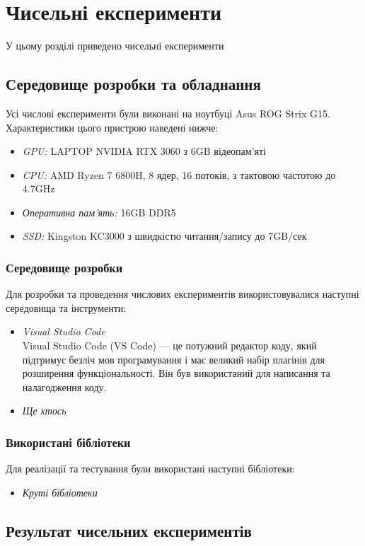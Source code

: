 

 \setcounter{chapter}{2}
 \chapter{Чисельні експерименти}
 У цьому розділі приведено чисельні експерименти
 
 \section{Середовище розробки та обладнання}
  \setcounter{equation}{0}
 \setcounter{theorem}{0}    

 Усі числові експерименти були виконані на ноутбуці Asus ROG Strix G15. Характеристики цього пристрою наведені нижче:
 
 \begin{itemize}
     \item \emph{GPU:} LAPTOP NVIDIA RTX 3060 з 6GB відеопам'яті
     \item \emph{CPU:} AMD Ryzen 7 6800H, 8 ядер, 16 потоків, з тактовою частотою до 4.7GHz
     \item \emph{Оперативна пам'ять:} 16GB DDR5
     \item \emph{SSD:} Kingston KC3000 з швидкістю читання/запису до 7GB/сек
 \end{itemize}
 
 \subsection{Середовище розробки}
 
 Для розробки та проведення числових експериментів використовувалися наступні середовища та інструменти:
 
 \begin{itemize}
     \item \emph{Visual Studio Code}\\
     Visual Studio Code (VS Code) — це потужний редактор коду, який підтримує безліч мов програмування і має великий набір плагінів для розширення функціональності. Він був використаний для написання та налагодження коду.
 
     \item \emph{Ще хтось}\\
 \end{itemize}
 
 \subsection{Використані бібліотеки}
 
 Для реалізації та тестування були використані наступні бібліотеки:
 
 \begin{itemize}
    \item \emph{Круті бібліотеки}\\
 \end{itemize}

\section{Результат чисельних експериментів}
  \setcounter{equation}{0}
 \setcounter{theorem}{0}